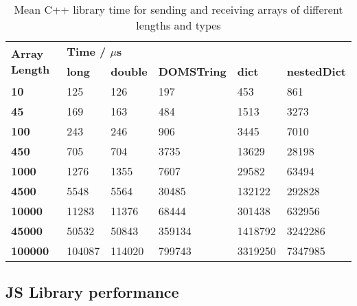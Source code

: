 \begin{table}[h]
\centering
\begin{tabular}{l|lllll}
\multirow{2}{*}{\textbf{Array Length}} & \multicolumn{5}{l}{\textbf{Time / $\mu$s}}                                                                             \\
                                       & \textbf{long} & \textbf{double} & \textbf{DOMSTring} & \textbf{dict} & \textbf{nestedDict} \\ \hline
\textbf{10}                            & 125                & 126                  & 197                     & 453                & 861                      \\
\textbf{45}                            & 169                & 163                  & 484                     & 1513               & 3273                     \\
\textbf{100}                           & 243                & 246                  & 906                     & 3445               & 7010                     \\
\textbf{450}                           & 705                & 704                  & 3735                    & 13629              & 28198                    \\
\textbf{1000}                          & 1276               & 1355                 & 7607                    & 29582              & 63494                    \\
\textbf{4500}                          & 5548               & 5564                 & 30485                   & 132122             & 292828                   \\
\textbf{10000}                         & 11283              & 11376                & 68444                   & 301438             & 632956                   \\
\textbf{45000}                         & 50532              & 50843                & 359134                  & 1418792            & 3242286                  \\
\textbf{100000}                        & 104087             & 114020               & 799743                  & 3319250            & 7347985                 
\end{tabular}
\caption{Mean C++ library time for sending and receiving arrays of different lengths and types}
\label{table:cpp_lib_time_arrays}
\end{table}

\subsection{JS Library performance}\label{js-library-performance}

